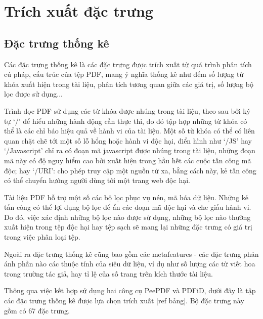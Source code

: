 \documentclass[./../main.tex]{subfiles}
\begin{document}
\section{Trích xuất đặc trưng}
\subsection{Đặc trưng thống kê}
Các đặc trưng thống kê là các đặc trưng được trích xuất từ quá trình phân tích cú pháp, cấu trúc của tệp PDF, mang ý nghĩa thống kê như đếm số lượng từ khóa xuất hiện trong tài liệu, phân tích tương quan giữa các giá trị, số lượng bộ lọc được sử dụng...

Trình đọc PDF sử dụng các từ khóa được nhúng trong tài liệu, theo sau bởi ký tự ‘\slash’ để hiểu những hành động cần thực thi, do đó tập hợp những từ khóa có thể là các chỉ báo hiệu quả về hành vi của tài liệu. Một số từ khóa có thể có liên quan chặt chẽ tới một số lỗ hổng hoặc hành vi độc hại, điển hình như ‘\slash JS’ hay ‘\slash Javascript’ chỉ ra có đoạn mã javascript được nhúng trong tài liệu, những đoạn mã này có độ nguy hiểm cao bởi xuất hiện trong hầu hết các cuộc tấn công mã độc; hay ‘\slash URI’: cho phép truy cập một nguồn từ xa, bằng cách này, kẻ tấn công có thể chuyển hướng người dùng tới một trang web độc hại.

Tài liệu PDF hỗ trợ một số các bộ lọc phục vụ nén, mã hóa dữ liệu. Những kẻ tấn công có thể lợi dụng bộ lọc để ẩn các đoạn mã độc hại và che giấu hành vi. Do đó, việc xác định những bộ lọc nào được sử dụng, những bộ lọc nào thường xuất hiện trong tệp độc hại hay tệp sạch sẽ mang lại những đặc trưng có giá trị trong việc phân loại tệp.

Ngoài ra đặc trưng thống kê cũng bao gồm các metafeatures - các đặc trưng phản ánh phần nào các thuộc tính của siêu dữ liệu, ví dụ như số lượng các từ viết hoa trong trường tác giả, hay tỉ lệ của số trang trên kích thước tài liệu.

Thông qua việc kết hợp sử dụng hai công cụ PeePDF và PDFiD, dưới đây là tập các đặc trưng thống kê được lựa chọn trích xuất [ref bảng]. Bộ đặc trưng này gồm có 67 đặc trưng.
\end{document}
